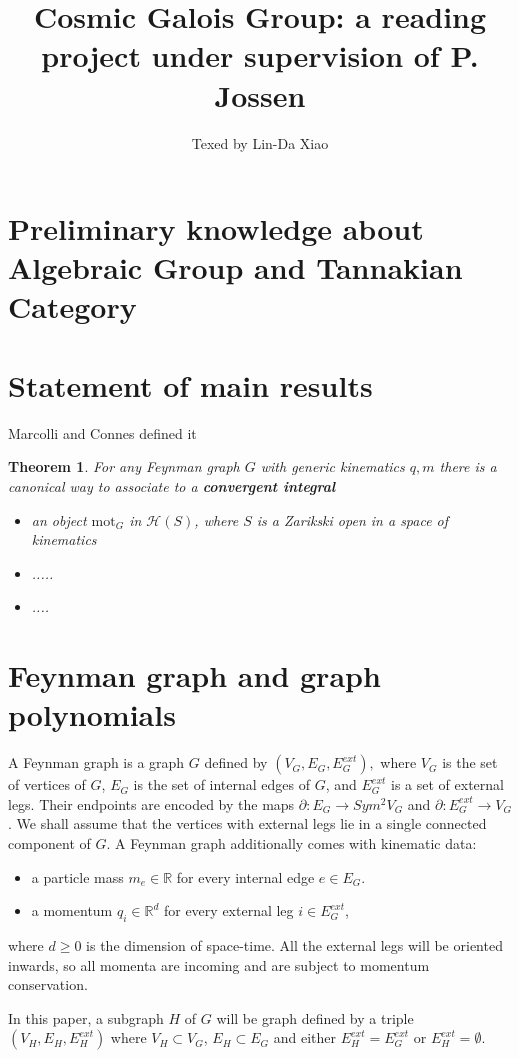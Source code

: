 \documentclass[11pt]{article}
\title{\bf Cosmic Galois Group: a reading project under supervision of P. Jossen}
\author{Texed by Lin-Da Xiao} %
\newtheorem{thm}{Theorem}[section]
\newcommand{\pd}{\partial}
\newcommand{\reals}{\mathbb R}
\newcommand{\lrta}{\longrightarrow}
\begin{document}
\maketitle
\tableofcontents
\newpage
\section{Preliminary knowledge about Algebraic Group and Tannakian Category}
\section{Statement of main results}
Marcolli and Connes defined it
\begin{thm}
For any Feynman graph $G$ with generic kinematics $q,m$ there is a canonical way to associate to a \textbf{convergent integral}
\begin{itemize}
\item an object $\text{mot}_G$ in $\mathcal{H}(S)$, where $S$ is a Zarikski open in a space of kinematics
\item .....
\item ....
\end{itemize}
\end{thm}
\section{Feynman graph and graph polynomials}
A Feynman graph is a graph $G$ defined by
$(V_G,E_G,E_G^{ext}),$ where $V_G$ is the set of vertices of $G$, $E_G$ is the set of internal edges of $G$, and $E^{ext}_G$ is a set of external legs. Their endpoints are encoded by the maps $\pd:E_G\lrta Sym^{2}V_G$ and $\pd:E_G^{ext}\lrta V_G$. We shall assume that the vertices with external legs lie in a single connected  component of $G$. A Feynman graph additionally comes with kinematic data:
\begin{itemize}
\item a particle mass $m_e\in \reals$ for every internal edge $e\in E_G$.
\item a momentum $q_i\in \reals^d$ for every external leg $i\in E^{ext}_G$,
\end{itemize}
where $d\geq 0$ is the dimension of space-time. All the external legs will be oriented inwards, so all momenta are incoming and are subject to momentum conservation.

In this paper, a subgraph $H$ of $G$ will be graph defined by a triple $(V_H,E_H,E^{ext}_H)$ where $V_H\subset V_G$, $E_H\subset E_G$ and either $E^{ext}_H=E^{ext}_G$ or $E^{ext}_H=\emptyset$.
\end{document}
